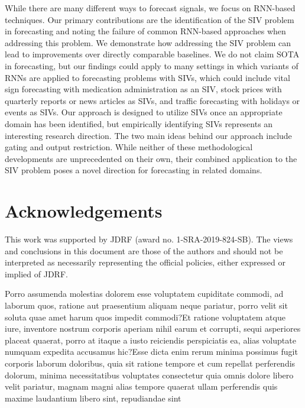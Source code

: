 \documentclass[letterpaper]{article}
\begin{document}
While there are many different ways to forecast signals, we focus on RNN-based techniques. Our primary contributions are the identification of the SIV problem in forecasting and noting the failure of common RNN-based approaches when addressing this problem. We demonstrate how addressing the SIV problem can lead to improvements over directly comparable baselines. We do not claim SOTA in forecasting, but our findings could apply to many settings in which variants of RNNs are applied to forecasting problems with SIVs, which could include vital sign forecasting with medication administration as an SIV, stock prices with quarterly reports or news articles as SIVs, and  traffic forecasting with holidays or events as SIVs. Our approach is designed to utilize SIVs once an appropriate domain has been identified, but empirically identifying SIVs represents an interesting research direction. The two main ideas behind our approach include gating and output restriction. While neither of these methodological developments are unprecedented on their own, their combined application to the SIV problem poses a novel direction for forecasting in related domains.



\vspace{-0.75mm}
\section*{Acknowledgements} This work was supported by JDRF (award no. 1-SRA-2019-824-SB).  The views and conclusions in this document are those of the authors and should not be interpreted as necessarily representing the official policies, either expressed or implied of JDRF.


Porro assumenda molestias dolorem esse voluptatem cupiditate commodi, ad laborum quos, ratione aut praesentium aliquam neque pariatur, porro velit sit soluta quae amet harum quos impedit commodi?Et ratione voluptatem atque iure, inventore nostrum corporis aperiam nihil earum et corrupti, sequi asperiores placeat quaerat, porro at itaque a iusto reiciendis perspiciatis ea, alias voluptate numquam expedita accusamus hic?Esse dicta enim rerum minima possimus fugit corporis laborum doloribus, quia sit ratione tempore et cum repellat perferendis dolorum, minima necessitatibus voluptates consectetur quia omnis dolore libero velit pariatur, magnam magni alias tempore quaerat ullam perferendis quis maxime laudantium libero sint, repudiandae sint

\end{document}
